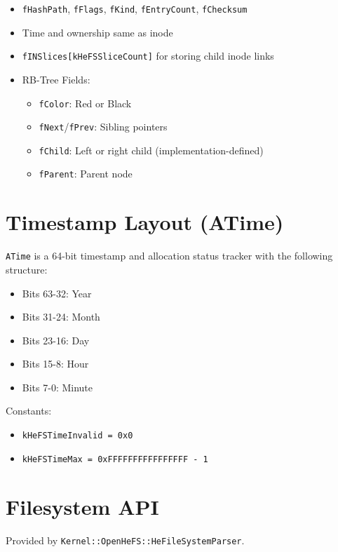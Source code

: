 \documentclass{article}
\begin{document}
\begin{itemize}
  \item \texttt{fHashPath}, \texttt{fFlags}, \texttt{fKind}, \texttt{fEntryCount}, \texttt{fChecksum}
  \item Time and ownership same as inode
  \item \texttt{fINSlices[kHeFSSliceCount]} for storing child inode links
\item RB-Tree Fields:
\begin{itemize}
  \item \texttt{fColor}: Red or Black
  \item \texttt{fNext}/\texttt{fPrev}: Sibling pointers
  \item \texttt{fChild}: Left or right child (implementation-defined)
  \item \texttt{fParent}: Parent node
\end{itemize}

\end{itemize}

\section{Timestamp Layout (ATime)}\label{sec:timestamp-layout-(atime)}

\texttt{ATime} is a 64-bit timestamp and allocation status tracker with the following structure:

\begin{itemize}
  \item Bits 63-32: Year
  \item Bits 31-24: Month
  \item Bits 23-16: Day
  \item Bits 15-8: Hour
  \item Bits 7-0: Minute
\end{itemize}

Constants:
\begin{itemize}
  \item \texttt{kHeFSTimeInvalid = 0x0}
  \item \texttt{kHeFSTimeMax = 0xFFFFFFFFFFFFFFFF - 1}
\end{itemize}

\section{Filesystem API}\label{sec:filesystem-api}

Provided by \texttt{Kernel::OpenHeFS::HeFileSystemParser}.
\end{document}
